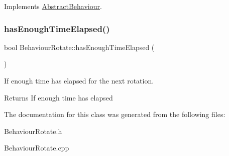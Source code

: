 Implements \mbox{\hyperlink{class_abstract_behaviour_ab99fb55a3b001e759e24d5b9721a742f}{Abstract\+Behaviour}}.

\mbox{\label{class_behaviour_rotate_a35e30578ca4a2a7fd96e01573e5791fd}} 
\subsubsection{\texorpdfstring{has\+Enough\+Time\+Elapsed()}{hasEnoughTimeElapsed()}}
{\footnotesize\ttfamily bool Behaviour\+Rotate\+::has\+Enough\+Time\+Elapsed (\begin{DoxyParamCaption}{ }\end{DoxyParamCaption})}



If enough time has elapsed for the next rotation. 

\begin{DoxyReturn}{Returns}
If enough time has elapsed
\end{DoxyReturn}


The documentation for this class was generated from the following files\+:\begin{DoxyCompactItemize}
\item 
Behaviour\+Rotate.\+h\item 
Behaviour\+Rotate.\+cpp\end{DoxyCompactItemize}
